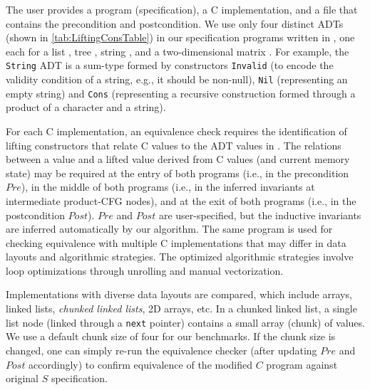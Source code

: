 The user provides a \SpecL{} program (specification), a C implementation,
and a file that contains the precondition and postcondition.
We use only four distinct ADTs (shown in \cref{tab:LiftingConsTable}) in our specification
programs written in \SpecL{}, one each for a list , tree ,
string , and a two-dimensional
matrix .
For example, the {\tt String} ADT is a sum-type formed by constructors
{\tt Invalid} (to
encode the validity condition of a string, e.g., it should be non-null),
{\tt Nil} (representing an empty string) and {\tt Cons} (representing
a recursive construction formed through a product of a character and a string).

For each C implementation, an equivalence check requires the identification of
lifting constructors that relate C values to the ADT values in \SpecL{}.
The relations between a \SpecL{} value and a lifted value derived from C values (and current memory state)
may be required at the entry of both programs (i.e., in the precondition $Pre$),
in the middle of both programs (i.e., in the inferred invariants at intermediate product-CFG
nodes), and at the exit of both programs (i.e., in the postcondition $Post$).
$Pre$ and $Post$ are user-specified, but the inductive invariants are inferred
automatically by our algorithm.
The same \SpecL{} program
is used for checking equivalence with multiple C implementations that may differ
in data layouts and algorithmic strategies.
The optimized algorithmic strategies involve
loop optimizations through unrolling and manual vectorization.

Implementations with
diverse data layouts are compared, which include arrays,
linked lists, {\em chunked linked lists}, 2D arrays, etc.
In a chunked linked list, a single list node (linked
through a {\tt next} pointer)
contains a small array (chunk) of values.
We use a default chunk size of four for our
benchmarks.
If the chunk size is changed, one
can simply re-run the equivalence checker
(after updating $Pre$ and $Post$ accordingly)
to confirm equivalence of the modified $C$ program against original $S$
specification.

